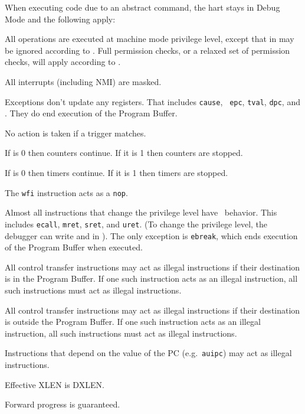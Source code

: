 \begin{steps}{When executing code due to an abstract command, the hart stays in
    Debug Mode and the following apply:}
\item All operations are executed at machine mode privilege level, except that
    \FcsrMcontrolMprv in \Rmstatus may be ignored according to \FcsrDcsrMprven.
    Full permission checks, or a relaxed set of permission checks, will apply
    according to \FdmAbstractcsRelaxedpriv.
\item All interrupts (including NMI) are masked.
\item Exceptions don't update any registers.  That includes {\tt cause}, {\tt
    epc}, {\tt tval}, {\tt dpc}, and \Rmstatus. They do end execution of the
    Program Buffer.
\item No action is taken if a trigger matches.
\item If \FcsrDcsrStopcount is 0 then counters continue. If it is 1 then
    counters are stopped.
\item If \FcsrDcsrStoptime is 0 then timers continue. If it is 1 then
    timers are stopped.
\item The {\tt wfi} instruction acts as a {\tt nop}.
\item Almost all instructions that change the privilege level have \unspecified\ 
    behavior.  This includes {\tt ecall}, {\tt mret}, {\tt sret}, and {\tt uret}.
    (To change the privilege level, the debugger can write
    \FcsrDcsrPrv and \FcsrDcsrV in \RcsrDcsr). The only exception is {\tt ebreak}, which ends
    execution of the Program Buffer when executed.
\item All control transfer instructions may act as illegal instructions if
    their destination is in the Program Buffer. If one such instruction acts as
    an illegal instruction, all such instructions must act as illegal
    instructions.
\item All control transfer instructions may act as illegal instructions if
    their destination is outside the Program Buffer. If one such instruction
    acts as an illegal instruction, all such instructions must act as
    illegal instructions.
\item Instructions that depend on the value of the PC (e.g.\ {\tt auipc}) may act
    as illegal instructions.
\item Effective XLEN is DXLEN.
\item Forward progress is guaranteed.
\end{steps}

